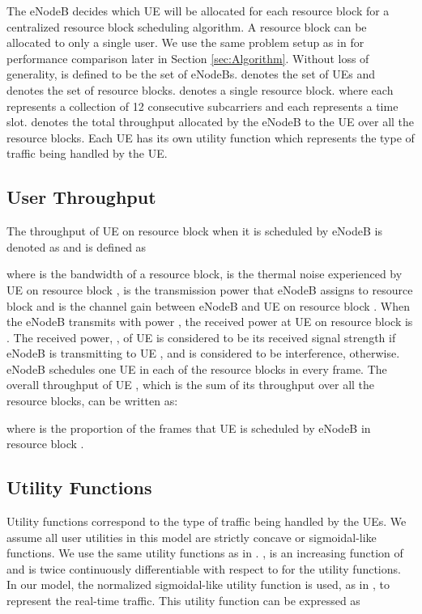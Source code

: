 \documentclass[journal]{IEEEtran} 				\IEEEoverridecommandlockouts 	\usepackage{amsmath,amssymb}
\begin{document}
The eNodeB decides which UE will be allocated for each resource block for a centralized resource block scheduling algorithm. A resource block can be allocated to only a single user. We use the same problem setup as in \cite{SelfOrganizedLTE} for performance comparison later in Section \ref{sec:Algorithm}. Without loss of generality,  is defined to be the set of eNodeBs.  denotes the set of UEs and  denotes the set of resource blocks.  denotes a single resource block.  where each  represents a collection of 12 consecutive subcarriers and each  represents a time slot.  denotes the total throughput allocated by the eNodeB to the  UE over all the resource blocks. Each UE has its own utility function  which represents the type of traffic being handled by the UE.  

\subsection{User Throughput}\label{sec:throughput}

The throughput of UE  on resource block  when it is scheduled by eNodeB  is denoted as  and is defined as 

where  is the bandwidth of a resource block,  is the thermal noise experienced by UE  on resource block ,  is the transmission power that eNodeB  assigns to resource block  and  is the channel gain between eNodeB  and UE  on resource block . When the eNodeB  transmits with power , the received power at UE  on resource block  is . The received power, , of UE  is considered to be its received signal strength if eNodeB  is transmitting to UE , and is considered to be interference, otherwise. eNodeB  schedules one UE in each of the resource blocks in every frame. The overall throughput of UE , which is the sum of its throughput over all the resource blocks, can be written as:

where  is the proportion of the frames that UE  is scheduled by eNodeB  in resource block .

\subsection{Utility Functions}\label{sec:utilities}

Utility functions correspond to the type of traffic being handled by the UEs. We assume all user utilities  in this model are strictly concave or sigmoidal-like functions. We use the same utility functions as in \cite{Ahmed_Utility1}. ,  is an increasing function of  and  is twice continuously differentiable with respect to  for the utility functions.
In our model, the normalized sigmoidal-like utility function is used, as in \cite{DL_PowerAllocation}, to represent the real-time traffic. This utility function can be expressed as 
\end{document}
